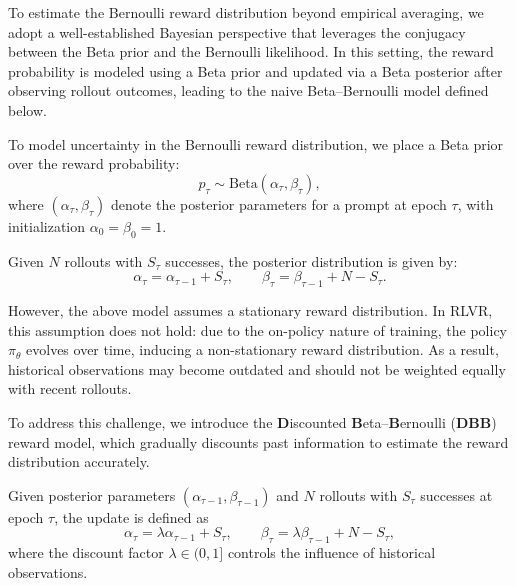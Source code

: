 To estimate the Bernoulli reward distribution beyond empirical averaging, we adopt a well-established Bayesian perspective that leverages the conjugacy between the Beta prior and the Bernoulli likelihood. In this setting, the reward probability is modeled using a Beta prior and updated via a Beta posterior after observing rollout outcomes, leading to the naive Beta--Bernoulli model defined below.

\begin{definition}
\label{def:beta_bernoulli}
To model uncertainty in the Bernoulli reward distribution, we place a Beta prior over the reward probability:
\begin{equation}
p_\tau \sim \mathrm{Beta}(\alpha_\tau, \beta_\tau),
\end{equation}
where $(\alpha_\tau, \beta_\tau)$ denote the posterior parameters for a prompt at epoch $\tau$, with initialization $\alpha_0=\beta_0=1$. 

Given $N$ rollouts with $S_\tau$ successes, the posterior distribution is given by:
\begin{equation}
\label{eq:param_update_bb}
\alpha_{\tau} = \alpha_{\tau-1} + S_\tau,
\qquad
\beta_{\tau} = \beta_{\tau-1} + N - S_\tau.
\end{equation}
\end{definition}

However, the above model assumes a stationary reward distribution. In RLVR, this assumption does not hold: due to the on-policy nature of training, the policy $\pi_{\theta}$ evolves over time, inducing a non-stationary reward distribution. As a result, historical observations may become outdated and should not be weighted equally with recent rollouts. 



To address this challenge, we introduce the \textbf{D}iscounted \textbf{B}eta--\textbf{B}ernoulli (\textbf{DBB}) reward model, which gradually discounts past information to estimate the reward distribution accurately. 

\begin{definition}
\label{def:discounted_beta_bernoulli}
Given posterior parameters $(\alpha_{\tau-1}, \beta_{\tau-1})$ and $N$ rollouts with $S_\tau$ successes at epoch $\tau$, the update is defined as
\begin{equation}
\label{eq:param_update_dbb}
\alpha_{\tau} = \lambda \alpha_{\tau-1} + S_\tau,
\qquad
\beta_{\tau} = \lambda \beta_{\tau-1} + N - S_\tau,
\end{equation}
where the discount factor $\lambda \in (0,1]$ controls the influence of historical observations. 
\end{definition}

